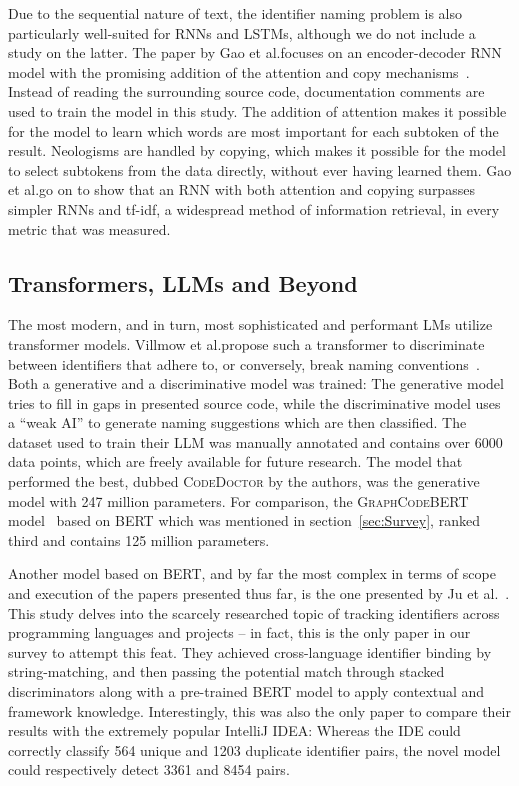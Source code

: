 \documentclass[conference]{IEEEtran}
\begin{document}
Due to the sequential nature of text, the identifier naming problem is also particularly
well-suited for \acp{RNN} and \acp{LSTM}, although we do not include a study on the
latter. The paper by Gao et al.\@ focuses on an encoder-decoder \ac{RNN} model with the
promising addition of the attention and copy mechanisms~\cite{Gao2019IdentGen}. Instead of
reading the surrounding source code, documentation comments are used to train the model in
this study. The addition of attention makes it possible for the model to learn which words
are most important for each subtoken of the result. Neologisms are handled by copying,
which makes it possible for the model to select subtokens from the data directly, without
ever having learned them. Gao et al.\@ go on to show that an \ac{RNN} with both attention
and copying surpasses simpler \acp{RNN} and tf-idf, a widespread method of information
retrieval, in every metric that was measured.


\subsection{Transformers, \acp{LLM} and Beyond}
\label{ssec:LLMs-and-Beyond}

The most modern, and in turn, most sophisticated and performant \acp{LM} utilize
transformer models. Villmow et al.\@ propose such a transformer to discriminate between
identifiers that adhere to, or conversely, break naming
conventions~\cite{Villmow2023Violations}. Both a generative and a discriminative model was
trained: The generative model tries to fill in gaps in presented source code, while the
discriminative model uses a \enquote{weak \ac{AI}} to generate naming suggestions which
are then classified. The dataset used to train their \ac{LLM} was manually annotated and
contains over 6000 data points, which are freely available for future research. The model
that performed the best, dubbed \textsc{CodeDoctor} by the authors, was the generative
model with 247 million parameters. For comparison, the \textsc{GraphCodeBERT}
model~\cite{Guo2020GraphCodeBERT} based on BERT which was mentioned in
section~\ref{sec:Survey}, ranked third and contains 125 million parameters.

Another model based on BERT, and by far the most complex in terms of scope and execution
of the papers presented thus far, is the one presented by Ju et
al.\@~\cite{Ju2023XLangBinding}. This study delves into the scarcely researched topic of
tracking identifiers across programming languages and projects -- in fact, this is the
only paper in our survey to attempt this feat. They achieved cross-language identifier
binding by string-matching, and then passing the potential match through stacked
discriminators along with a pre-trained BERT model to apply contextual and framework
knowledge. Interestingly, this was also the only paper to compare their results with the
extremely popular IntelliJ IDEA: Whereas the IDE could correctly classify 564 unique and
1203 duplicate identifier pairs, the novel model could respectively detect 3361 and 8454
pairs.
\end{document}

